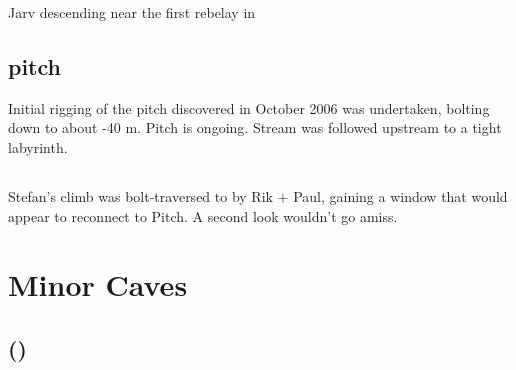 \begin{marginfigure}
\caption{Jarv descending near the first rebelay in  }
\end{marginfigure}


\subsection{ 
pitch}

Initial rigging of the  pitch discovered in October 2006 was
undertaken, bolting down to about -40 m. Pitch is ongoing.
Stream was followed upstream to a tight labyrinth.

\subsection{}

Stefan's climb was bolt-traversed to by Rik + Paul, gaining a window
that would appear to reconnect to  Pitch. A second look
wouldn't go amiss.

\section{Minor Caves}

\subsection{ ()}

